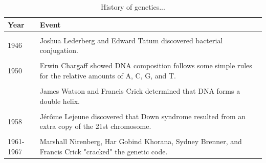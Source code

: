 \documentclass[11pt,ignorenonframetext,aspectratio=169]{beamer}
\begin{document}
\begin{frame}{}
\protect\hypertarget{section-10}{}
\begin{table}

\caption{\label{tab:history-table2}History of genetics...}
\centering
\fontsize{8}{10}\selectfont
\begin{tabular}[t]{l>{\raggedright\arraybackslash}p{40em}}
\toprule
Year & Event\\
\midrule
\cellcolor{gray!6}{1944} & \cellcolor{gray!6}{Oswald Avery, Colin MacLeod, and Maclyn McCarty provided compelling evidence that DNA is the genetic material in bacterial cells.}\\
1946 & Joshua Lederberg and Edward Tatum discovered bacterial conjugation.\\
\cellcolor{gray!6}{1948} & \cellcolor{gray!6}{Barbara McClintock discovered mobile elements (transposons) that move from one place to another in the genome.}\\
1950 & Erwin Chargaff showed DNA composition follows some simple rules for the relative amounts of A, C, G, and T.\\
\cellcolor{gray!6}{1952} & \cellcolor{gray!6}{Alfred Hershey and Martha Chase proved that DNA is the molecule that encodes genetic information.}\\
\addlinespace
1953 & James Watson and Francis Crick determined that DNA forms a double helix.\\
\cellcolor{gray!6}{1958} & \cellcolor{gray!6}{Matthew Meselson and Franklin Stahl demonstrated the semiconservative nature of DNA replication.}\\
1958 & Jérôme Lejeune discovered that Down syndrome resulted from an extra copy of the 21st chromosome.\\
\cellcolor{gray!6}{1961} & \cellcolor{gray!6}{François Jacob and Jacques Monod proposed that enzyme levels in cells are controlled by feedback mechanisms.}\\
1961-1967 & Marshall Nirenberg, Har Gobind Khorana, Sydney Brenner, and Francis Crick "cracked" the genetic code.\\
\bottomrule
\end{tabular}
\end{table}
\end{frame}
\end{document}
